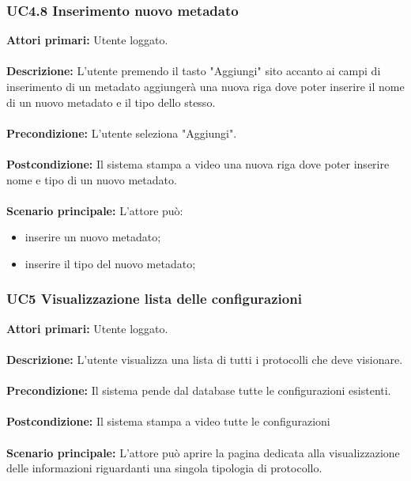 \subsubsection{UC4.8 Inserimento nuovo metadato}
    \label{UC4.8}
    \textbf{Attori primari:} Utente loggato.
    \\
    \\
    \textbf{Descrizione:} L'utente premendo il tasto "Aggiungi" sito accanto ai campi di inserimento di un metadato aggiungerà una nuova riga dove poter inserire il nome di un nuovo metadato e il tipo dello stesso.
    \\
    \\
    \textbf{Precondizione:} L'utente seleziona "Aggiungi".
    \\
    \\
    \textbf{Postcondizione:} Il sistema stampa a video una nuova riga dove poter inserire nome e tipo di un nuovo metadato.
    \\
    \\
    \textbf{Scenario principale:} L'attore può:
        \begin{itemize}
            \item inserire un nuovo metadato;
            \item inserire il tipo del nuovo metadato;
        \end{itemize}
        
\subsubsection{UC5 Visualizzazione lista delle configurazioni}
    \label{UC5}
    \textbf{Attori primari:} Utente loggato.
    \\
    \\
    \textbf{Descrizione:} L'utente visualizza una lista di tutti i protocolli che deve visionare.
    \\
    \\
    \textbf{Precondizione:} Il sistema pende dal database tutte le configurazioni esistenti.
    \\
    \\
    \textbf{Postcondizione:} Il sistema stampa a video tutte le configurazioni
    \\
    \\
    \textbf{Scenario principale:} L'attore può aprire la pagina dedicata alla visualizzazione delle informazioni riguardanti una singola tipologia di protocollo.
    
